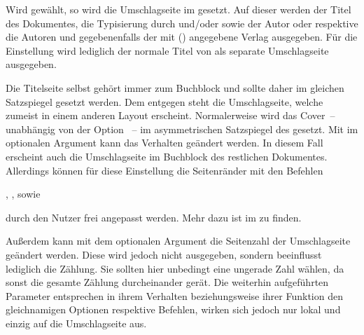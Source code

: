 \begin{DeclareEntity*}{}
\begin{DeclareEntity*}{}
\begin{DeclareEntity*}{}
\begin{Declaration}
\begin{Declaration}
\begin{Declaration}
\begin{Declaration}
\begin{Declaration}
\begin{Declaration}
\begin{Declaration}
\begin{Declaration}
\begin{Declaration}
\begin{Declaration}
\begin{Declaration}
Wird  gewählt, so wird die Umschlagseite im \TUDCD 
gesetzt. Auf dieser werden der Titel des Dokumentes, die Typisierung 
durch  und/oder  sowie der Autor oder respektive 
die Autoren und gegebenenfalls der mit ()
angegebene Verlag ausgegeben.
%
Für die Einstellung  wird lediglich der normale 
Titel von \KOMAScript{} als separate Umschlagseite ausgegeben. 

Die Titelseite selbst gehört immer zum Buchblock und sollte daher im gleichen 
Satzspiegel gesetzt werden. Dem entgegen steht die Umschlagseite, welche 
zumeist in einem anderen Layout erscheint. Normalerweise wird das Cover~-- 
unabhängig von der Option ~-- im asymmetrischen Satzspiegel 
des \CDs gesetzt. Mit  im optionalen 
Argument kann das Verhalten geändert werden. In diesem Fall erscheint auch die 
Umschlagseite im Buchblock des restlichen Dokumentes. Allerdings können für 
diese Einstellung die Seitenränder mit den Befehlen 
\begin{Entity}{}
, , 
 sowie   
\end{Entity}
durch den Nutzer frei angepasst werden. Mehr dazu ist im \scrguide zu finden.

Außerdem kann mit dem optionalen Argument die Seitenzahl der Umschlagseite 
geändert werden. Diese wird jedoch nicht ausgegeben, sondern beeinflusst 
lediglich die Zählung. Sie sollten hier unbedingt eine ungerade Zahl wählen, da 
sonst die gesamte Zählung durcheinander gerät. Die weiterhin aufgeführten 
Parameter entsprechen in ihrem Verhalten beziehungsweise ihrer Funktion den 
gleichnamigen Optionen respektive Befehlen, wirken sich jedoch nur lokal und 
einzig auf die Umschlagseite aus.%
\end{Declaration}
\end{Declaration}
\end{Declaration}
\end{Declaration}
\end{Declaration}
\end{Declaration}
\end{Declaration}
\end{Declaration}
\end{Declaration}
\end{Declaration}
\end{Declaration}


\end{DeclareEntity*}
\end{DeclareEntity*}
\end{DeclareEntity*}
